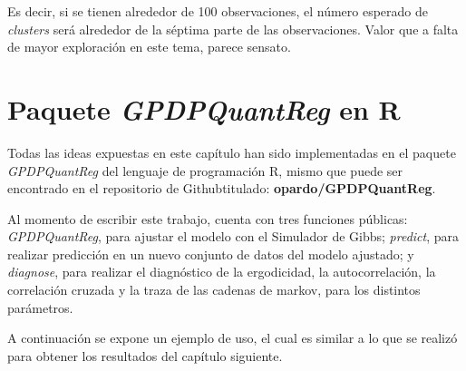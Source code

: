 Es decir, si se tienen alrededor de 100 observaciones, el n\'umero esperado de \textit{clusters} ser\'a alrededor de la s\'eptima parte de las observaciones. Valor que a falta de mayor exploraci\'on en este tema, parece sensato.

\section{Paquete \textit{GPDPQuantReg} en R}

Todas las ideas expuestas en este cap\'itulo han sido implementadas en el paquete \textit{GPDPQuantReg} del lenguaje de programaci\'on R, mismo que puede ser encontrado en el repositorio de Github\faGithub \space titulado: \textbf{opardo/GPDPQuantReg}.

Al momento de escribir este trabajo, cuenta con tres funciones p\'ublicas: \textit{GPDPQuantReg}, para ajustar el modelo con el Simulador de Gibbs; \textit{predict}, para realizar predicci\'on en un nuevo conjunto de datos del modelo ajustado; y \textit{diagnose}, para realizar el diagn\'ostico de la ergodicidad, la autocorrelaci\'on, la correlaci\'on cruzada y la traza de las cadenas de markov, para los distintos par\'ametros.

A continuaci\'on se expone un ejemplo de uso, el cual es similar a lo que se realiz\'o para obtener los resultados del cap\'itulo siguiente.



\newpage